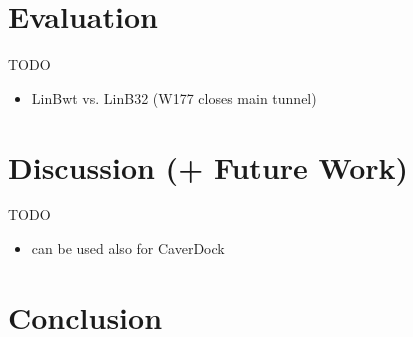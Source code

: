 \documentclass{vgtc}                          %
\begin{document}
\section{Evaluation}

TODO
\begin{itemize}
  \item LinBwt vs. LinB32 (W177 closes main tunnel)
\end{itemize}

\section{Discussion (+ Future Work)}
\label{sec:discussion}

TODO
\begin{itemize}
  \item can be used also for CaverDock
\end{itemize}

\section{Conclusion}


%

%
%
%


\end{document}
